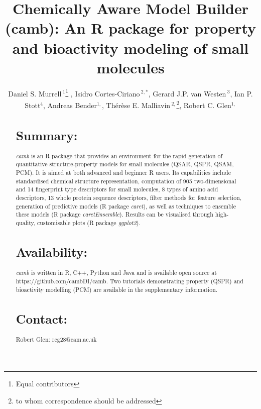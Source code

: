 \documentclass{bioinfo}
\begin{document}

\title{Chemically Aware Model Builder (camb): An R package for property and bioactivity modeling of small molecules}
\author[Murrell \& Cortes-Ciriano \it{et~al}]{Daniel S. Murrell\,$^{1}$\footnote{Equal contributors} , Isidro Cortes-Ciriano\,$^{2,*}$, Gerard J.P. van Westen\,$^{3}$, Ian P. Stott$^{4}$, Andreas Bender$^{1,}$\dag, Th\'er\`ese E. Malliavin\,$^{2,}$\footnote{to whom correspondence should be addressed},  Robert C. Glen$^{1,}$\dag}
\address{$^{1}$Unilever Centre for Molecular Science Informatics, Department of Chemistry, University of Cambridge, Lensfield Road, Cambridge CB2 1EW, United Kingdom.\\
$^{2}$Unite de Bioinformatique Structurale, Institut Pasteur and CNRS UMR 3825, Structural Biology and Chemistry Department, 25, rue Dr. Roux, 75 724 Paris, France.\\
$^{3}$European Molecular Biology Laboratory European Bioinformatics Institute Wellcome Trust Genome Campus, Hinxton, United Kingdom.\\
$^{4}$Unilever Research, Bebington, UK}


\maketitle

\begin{abstract}
\section{Summary:}
{\it camb} is an R package that provides an environment for the rapid generation of quantitative structure-property models for small molecules (QSAR, QSPR, QSAM, PCM). It is aimed at both advanced and beginner R users.
Its capabilities include standardised chemical structure representation, computation of 905 two-dimensional and 14 fingerprint type descriptors for small molecules, 8 types of amino acid descriptors, 13 whole protein sequence descriptors, filter methods for feature selection, generation of predictive models (R package {\it caret}), as well as techniques to ensemble these models (R package {\it caretEnsemble}).
Results can be visualised through high-quality, customisable plots (R package {\it ggplot2}).
\section{Availability:} {\it camb} is written in R, C++, Python and Java and is available open source
at https://github.com/cambDI/camb.
Two tutorials demonstrating property (QSPR) and bioactivity modelling (PCM) are available in the supplementary information.\\
\section{Contact:} Robert Glen: rcg28@cam.ac.uk
\end{abstract}
\end{document}
